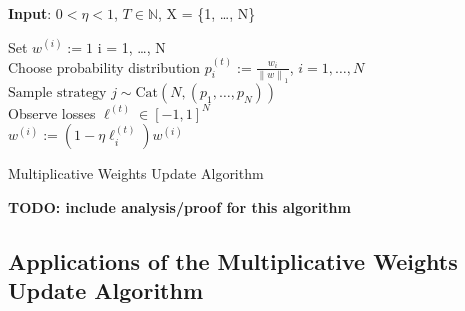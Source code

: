 \documentclass[12pt]{article}
\newcommand*{\norm}[1]{\left\lVert#1\right\rVert}
\begin{document}
 \begin{algorithm}[H]
	\SetAlgoLined
	
	\textbf{Input}: $0 < \eta < 1$, $T \in \mathbb{N}$,  X = \{1, \dots, N\} \\
	
	\bigskip
	
	Set $w^{(i)} := 1$  i = 1, \dots, N \\
	
	 {
		Choose probability distribution $p^{(t)}_i := \frac{w_i}{\norm{w}_1}$, $i = 1, \dots, N$ \\
		$\text{Sample strategy } j \sim \text{Cat}(N, (p_1, \dots, p_N))$ \\
		Observe losses $\ell^{(t)} \in [-1, 1]^N$ \\
		
		 {
			$w^{(i)} := (1 - \eta \ell_i^{(t)})w^{(i)}$ \\
		}
	}			
\caption{Multiplicative Weights Update Algorithm}
\end{algorithm}

\bigskip

\textbf{TODO: include analysis/proof for this algorithm}

\subsection{Applications of the Multiplicative Weights Update Algorithm}
\end{document}
